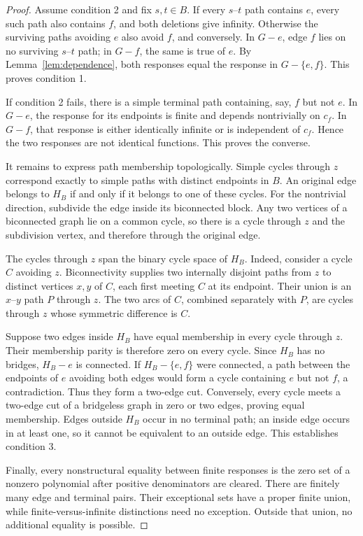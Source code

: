 \documentclass[11pt,letterpaper]{article}
\begin{document}
\begin{proof}
Assume condition 2 and fix $s,t\in B$. If every $s$--$t$ path contains $e$, every such path also contains $f$, and both deletions give infinity. Otherwise the surviving paths avoiding $e$ also avoid $f$, and conversely. In $G-e$, edge $f$ lies on no surviving $s$--$t$ path; in $G-f$, the same is true of $e$. By Lemma~\ref{lem:dependence}, both responses equal the response in $G-\{e,f\}$. This proves condition 1.

If condition 2 fails, there is a simple terminal path containing, say, $f$ but not $e$. In $G-e$, the response for its endpoints is finite and depends nontrivially on $c_f$. In $G-f$, that response is either identically infinite or is independent of $c_f$. Hence the two responses are not identical functions. This proves the converse.

It remains to express path membership topologically. Simple cycles through $z$ correspond exactly to simple paths with distinct endpoints in $B$. An original edge belongs to $H_B$ if and only if it belongs to one of these cycles. For the nontrivial direction, subdivide the edge inside its biconnected block. Any two vertices of a biconnected graph lie on a common cycle, so there is a cycle through $z$ and the subdivision vertex, and therefore through the original edge.

The cycles through $z$ span the binary cycle space of $H_B$. Indeed, consider a cycle $C$ avoiding $z$. Biconnectivity supplies two internally disjoint paths from $z$ to distinct vertices $x,y$ of $C$, each first meeting $C$ at its endpoint. Their union is an $x$--$y$ path $P$ through $z$. The two arcs of $C$, combined separately with $P$, are cycles through $z$ whose symmetric difference is $C$.

Suppose two edges inside $H_B$ have equal membership in every cycle through $z$. Their membership parity is therefore zero on every cycle. Since $H_B$ has no bridges, $H_B-e$ is connected. If $H_B-\{e,f\}$ were connected, a path between the endpoints of $e$ avoiding both edges would form a cycle containing $e$ but not $f$, a contradiction. Thus they form a two-edge cut. Conversely, every cycle meets a two-edge cut of a bridgeless graph in zero or two edges, proving equal membership. Edges outside $H_B$ occur in no terminal path; an inside edge occurs in at least one, so it cannot be equivalent to an outside edge. This establishes condition 3.

Finally, every nonstructural equality between finite responses is the zero set of a nonzero polynomial after positive denominators are cleared. There are finitely many edge and terminal pairs. Their exceptional sets have a proper finite union, while finite-versus-infinite distinctions need no exception. Outside that union, no additional equality is possible.
\end{proof}
\end{document}
